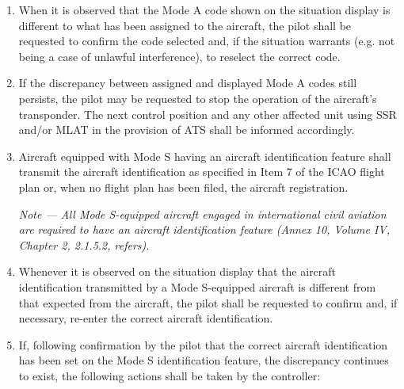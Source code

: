 \documentclass[../main.tex]{subfiles}
\begin{document}
    \begin{enumerate}
        \item When it is observed that the Mode A code shown on the situation display is different to what has been assigned to the aircraft, the pilot shall be requested to confirm the code selected and, if the situation warrants (e.g. not being a case of unlawful interference), to reselect the correct code.
        \item If the discrepancy between assigned and displayed Mode A codes still persists, the pilot may be requested to stop the operation of the aircraft’s transponder. The next control position and any other affected unit using SSR and/or MLAT in the provision of ATS shall be informed accordingly.
        \item Aircraft equipped with Mode S having an aircraft identification feature shall transmit the aircraft identification as specified in Item 7 of the ICAO flight plan or, when no flight plan has been filed, the aircraft registration.

        \textit{Note --- All Mode S-equipped aircraft engaged in international civil aviation are required to have an aircraft identification feature (Annex 10, Volume IV, Chapter 2, 2.1.5.2, refers).}
        
        \item Whenever it is observed on the situation display that the aircraft identification transmitted by a Mode S-equipped aircraft is different from that expected from the aircraft, the pilot shall be requested to confirm and, if necessary, re-enter the correct aircraft identification.
        \item If, following confirmation by the pilot that the correct aircraft identification has been set on the Mode S identification feature, the discrepancy continues to exist, the following actions shall be taken by the controller:

    \end{enumerate}
\end{document}
